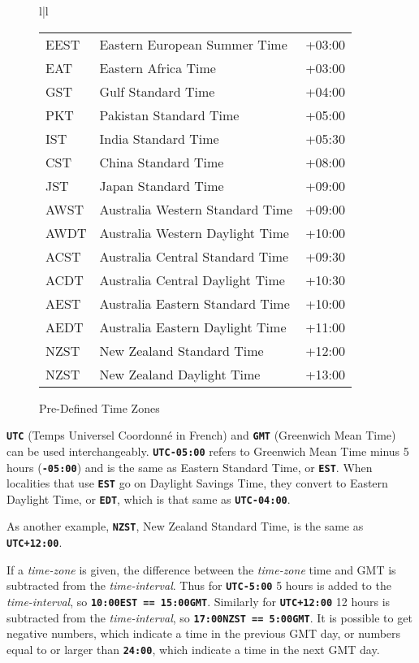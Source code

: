 \documentclass[12pt]{article}
\makeatletter
\newcommand{\TT}[1]{{\tt \bfseries #1}}
\newcommand{\ttkey}[1]{\TT{#1}\index{#1@{\tt #1}}}
\newlength{\figurewidth}
\newenvironment{boxedfigure}[1][!btp]%
	{\begin{figure*}[#1]
	 \begin{lrbox}{\figurebox}
	 \begin{minipage}{\figurewidth}

	 \vspace*{1ex}}%
	{
	 \vspace*{1ex}

	 \end{minipage}
	 \end{lrbox}
	 \begin{center}
	 \fbox{\hspace*{0.1in}\usebox{\figurebox}\hspace*{0.1in}}
	 \end{center}
	 \end{figure*}}
\makeatother
\begin{document}
\begin{boxedfigure}[t]
\begin{center}
\begin{tabular}{l|l}
\begin{tabular}{@{}lll@{}}
EEST  & Eastern European Summer Time  & +03:00 \\
EAT   & Eastern Africa Time           & +03:00 \\
GST   & Gulf Standard Time            & +04:00 \\
PKT   & Pakistan Standard Time        & +05:00 \\
IST   & India Standard Time           & +05:30 \\
CST   & China Standard Time           & +08:00 \\
JST   & Japan Standard Time           & +09:00 \\
AWST  & Australia Western Standard Time        & +09:00 \\
AWDT  & Australia Western Daylight Time        & +10:00 \\
ACST  & Australia Central Standard Time        & +09:30 \\
ACDT  & Australia Central Daylight Time        & +10:30 \\
AEST  & Australia Eastern Standard Time        & +10:00 \\
AEDT  & Australia Eastern Daylight Time        & +11:00 \\
NZST  & New Zealand Standard Time     & +12:00 \\
NZST  & New Zealand Daylight Time     & +13:00 \\
\end{tabular}
\end{tabular}
\end{center}
\vspace*{-3ex}
\caption{Pre-Defined Time Zones}
\label{PRE-DEFINED-TIME-ZONES}
\end{boxedfigure}

\ttkey{UTC} (Temps Universel Coordonn\'e in French) and \ttkey{GMT}
(Greenwich Mean Time) can be used interchangeably.
\TT{UTC-05:00} refers to Greenwich Mean Time
minus 5 hours (\TT{-05:00}) and is the same as
Eastern Standard Time, or \TT{EST}.   When localities that use \TT{EST}
go on Daylight Savings Time, they convert to Eastern Daylight Time, or
\TT{EDT}, which is that same as \TT{UTC-04:00}.

As another example, \TT{NZST}, New Zealand Standard Time, is the same
as \TT{UTC+12:00}.

If a {\em time-zone} is given, the difference between the {\em time-zone}
time and GMT is subtracted from the {\em time-interval}.
Thus for \TT{UTC-5:00} 5 hours is added to the {\em time-interval},
so \TT{10:00EST == 15:00GMT}.
Similarly
for \TT{UTC+12:00} 12 hours is subtracted from the {\em time-interval},
so \TT{17:00NZST == 5:00GMT}.
It is possible to get negative numbers, which indicate a time in the previous
GMT day, or numbers equal to or larger than \TT{24:00}, which indicate
a time in the next GMT day.
\end{document}
